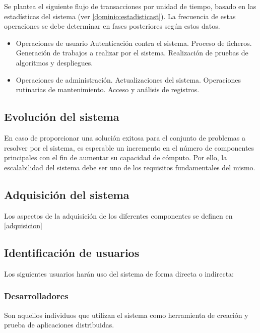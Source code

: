 Se plantea el siguiente flujo de transacciones por unidad de tiempo, basado en las estadísticas del sistema (ver \ref{dominio:estadisticast}). La frecuencia de estas operaciones se debe determinar en fases posteriores según estos datos.

\begin{itemize}
\item Operaciones de usuario
\subitem Autenticación contra el sistema.
\subitem Proceso de ficheros.
\subitem Generación de trabajos a realizar por el sistema.
\subitem Realización de pruebas de algoritmos y despliegues.
\item Operaciones de administración.
\subitem Actualizaciones del sistema.
\subitem Operaciones rutinarias de mantenimiento.
\subitem Acceso y análisis de registros.
\end{itemize}

\subsection{Evolución del sistema}

En caso de proporcionar una solución exitosa para el conjunto de problemas a resolver por el sistema, es esperable un incremento en el número de componentes principales con el fin de aumentar su capacidad de cómputo. Por ello, la escalabilidad del sistema debe ser uno de los requisitos fundamentales del mismo.

\subsection{Adquisición del sistema}

Los aspectos de la adquisición de los diferentes componentes se definen en \ref{adquisicion}

\subsection{Identificación de usuarios}

Los siguientes usuarios harán uso del sistema de forma directa o indirecta:

\subsubsection{Desarrolladores}

Son aquellos individuos que utilizan el sistema como herramienta de creación y prueba de aplicaciones distribuidas.

